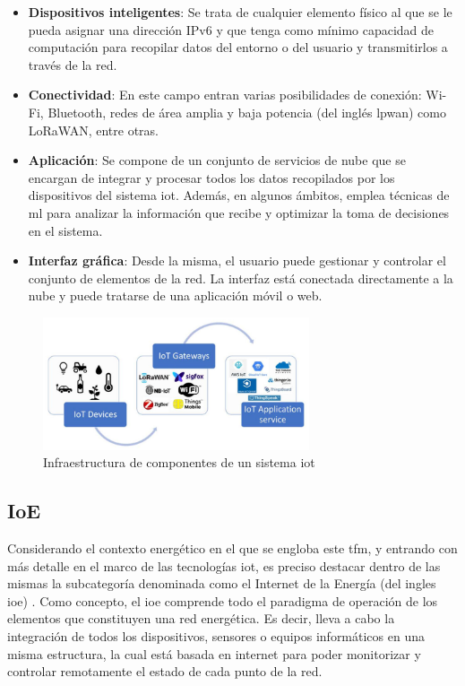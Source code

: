 \pagebreak

\begin{itemize}
    \item \textbf{Dispositivos inteligentes}: Se trata de cualquier elemento físico al que se le pueda asignar una dirección IPv6 y que tenga como mínimo capacidad de computación para recopilar datos del entorno o del usuario y transmitirlos a través de la red. 
    \item \textbf{Conectividad}: En este campo entran varias posibilidades de conexión: Wi-Fi, Bluetooth, redes de área amplia y baja potencia (del inglés \gls{lpwan}) como LoRaWAN, entre otras.
    \item \textbf{Aplicación}: Se compone de un conjunto de servicios de nube que se encargan de integrar y procesar todos los datos recopilados por los dispositivos del sistema \gls{iot}. Además, en algunos ámbitos, emplea técnicas de \gls{ml} para analizar la información que recibe y optimizar la toma de decisiones en el sistema.
    \item \textbf{Interfaz gráfica}: Desde la misma, el usuario puede gestionar y controlar el conjunto de elementos de la red. La interfaz está conectada directamente a la nube y puede tratarse de una aplicación móvil o web.
\end{itemize}

\begin{figure}[h!]
    \centering
    \includegraphics[width=0.7\textwidth]{img/teoria/iot.png}
    \caption{Infraestructura de componentes de un sistema \acrshort{iot} \cite{iotscheme}}
    \label{fig:iot}
\end{figure}

\subsection{IoE}
\label{sec:ioe}

Considerando el contexto energético en el que se engloba este \gls{tfm}, y entrando con más detalle en el marco de las tecnologías \gls{iot}, es preciso destacar dentro de las mismas la subcategoría denominada como el Internet de la Energía (del ingles \gls{ioe}) \cite{ioe}. Como concepto, el \gls{ioe} comprende todo el paradigma de operación de los elementos que constituyen una red energética. Es decir, lleva a cabo la integración de todos los dispositivos, sensores o equipos informáticos en una misma estructura, la cual está basada en internet para poder monitorizar y controlar remotamente el estado de cada punto de la red.

